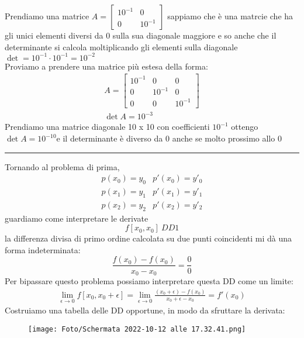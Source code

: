 \documentclass[a4paper, portrait]{book}
\numberwithin{equation}{chapter} %
\newcommand*\sepline{%
  \begin{center}
    \rule[1ex]{.5\textwidth}{.5pt}
  \end{center}}
\begin{document}
Prendiamo una matrice $A = \begin{bmatrix}
    10^{-1}&0\\
    0&10^{-1}
\end{bmatrix}$ sappiamo che è una matrcie che ha gli unici elementi diversi da 0 sulla sua diagonale maggiore e so anche che il determinante si calcola moltiplicando gli elementi sulla diagonale $\det = 10^{-1} \cdot 10^{-1} = 10^{-2}$\\
Proviamo a prendere una matrice più estesa della forma:
\begin{gather}
    A = \begin{bmatrix}
        10^{-1}&0&0\\
        0&10^{-1}&0\\
        0&0&10^{-1}
    \end{bmatrix}\\
    \det A = 10^{-3}
\end{gather}
Prendiamo una matrice diagonale 10 x 10 con coefficienti $10^{-1}$ ottengo $\det A = 10^{-10}$e il determinante è diverso da 0 anche se molto prossimo allo 0\\
\sepline{}
Tornando al problema di prima, 
\begin{equation}
    \begin{matrix}
        p(x_0) = y_0&p'(x_0) = y'_0\\
        p(x_1) = y_1&p'(x_1) = y'_1\\
        p(x_2) = y_2&p'(x_2) = y'_2
    \end{matrix}
\end{equation}
guardiamo come interpretare le derivate
\begin{equation}
    f[x_0,x_0] \ DD1
\end{equation}
la differenza divisa di primo ordine calcolata su due punti coincidenti mi dà una forma indeterminata:
\begin{equation}
    \frac{f(x_0)-f(x_0)}{x_0-x_0} = \frac{0}{0}
\end{equation}
Per bipassare questo problema possiamo interpretare questa DD come un limite:
\begin{gather}
    \lim_{\epsilon \rightarrow 0} f[x_0,x_0 + \epsilon] = \lim_{\epsilon \rightarrow 0} \frac{(x_0 + \epsilon)-f(x_0)}{x_0 + \epsilon - x_0} = f'(x_0)
\end{gather}
Costruiamo una tabella delle DD opportune, in modo da sfruttare la derivata:
\begin{figure}[h!]
    \centering
    \texttt{[image: Foto/Schermata 2022-10-12 alle 17.32.41.png]}
    \caption{}
\end{figure}
\end{document}
